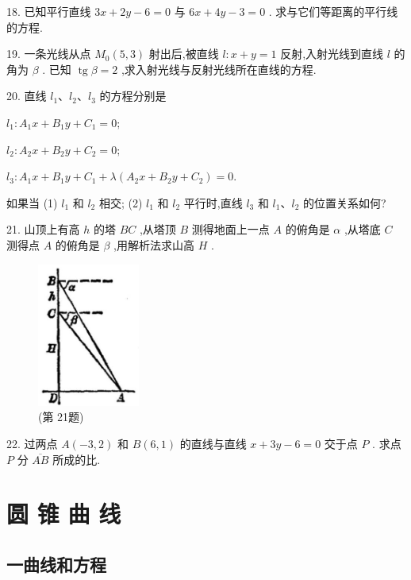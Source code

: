 \documentclass[lang=cn,newtx,10.5pt,scheme=chinese]{elegantbook}
\begin{document}
18. 已知平行直线 \({3x} + {2y} - 6 = 0\) 与 \({6x} + {4y} - 3 = 0\) . 求与它们等距离的平行线的方程.

19. 一条光线从点 \({M}_{0}\left( {5,3}\right)\) 射出后,被直线 \(l : x + y = 1\) 反射,入射光线到直线 \(l\) 的角为 \(\beta\) . 已知 \(\operatorname{tg}\beta = 2\) ,求入射光线与反射光线所在直线的方程.

20. 直线 \({l}_{1}\text{、}{l}_{2}\text{、}{l}_{3}\) 的方程分别是

\({l}_{1} : {A}_{1}x + {B}_{1}y + {C}_{1} = 0;\)

\({l}_{2} : {A}_{2}x + {B}_{2}y + {C}_{2} = 0;\)

\({l}_{3} : {A}_{1}x + {B}_{1}y + {C}_{1} + \lambda \left( {{A}_{2}x + {B}_{2}y + {C}_{2}}\right) = 0.\)

如果当 (1) \({l}_{1}\) 和 \({l}_{2}\) 相交; (2) \({l}_{1}\) 和 \({l}_{2}\) 平行时,直线 \({l}_{3}\) 和 \({l}_{1}\text{、}{l}_{2}\) 的位置关系如何?

21. 山顶上有高 \(h\) 的塔 \({BC}\) ,从塔顶 \(B\) 测得地面上一点 \(A\) 的俯角是 \(\alpha\) ,从塔底 \(C\) 测得点 \(A\) 的俯角是 \(\beta\) ,用解析法求山高 \(H\) .

\begin{figure}[h]
  \centering
  \includegraphics[max width=0.3\textwidth]{images/01912cc2-ffb6-728e-9ae7-b113ff05c64b_64_551024.jpg}
  \caption{(第 21题)}
\end{figure}



22. 过两点 \(A\left( {-3,2}\right)\) 和 \(B\left( {6,1}\right)\) 的直线与直线 \(x + {3y} - 6 = 0\) 交于点 \(P\) . 求点 \(P\) 分 \(\overline{AB}\) 所成的比.


\chapter{圆 锥 曲 线}

\section*{一\text{ }曲线和方程}
\end{document}
